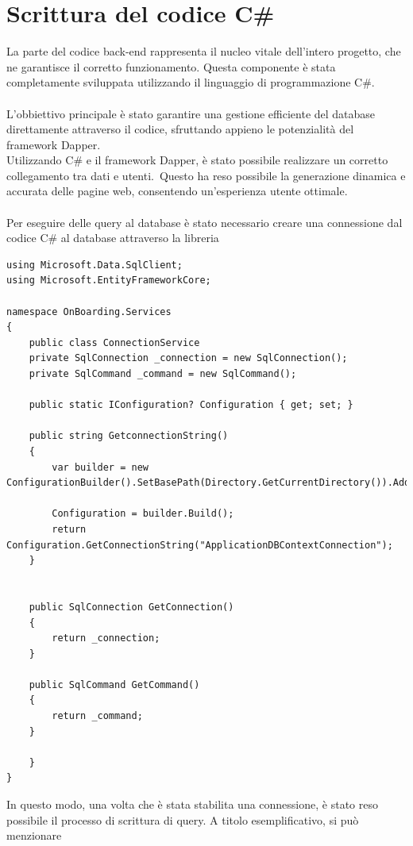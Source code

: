 \section{Scrittura del codice C\#}\label{sec:cap_sec_subsec}
La parte del codice back-end rappresenta il nucleo vitale dell'intero progetto, 
che ne garantisce il corretto funzionamento. Questa componente è stata completamente 
sviluppata utilizzando il linguaggio di programmazione C\#.
\\ \\
L'obbiettivo principale è stato garantire una gestione efficiente del database
direttamente attraverso il codice, sfruttando appieno le potenzialità del
framework Dapper. \\ 
Utilizzando C\# e il framework Dapper, è stato possibile
realizzare un corretto collegamento tra dati e utenti.\ Questo ha reso
possibile la generazione dinamica e accurata delle pagine web, consentendo
un'esperienza utente ottimale. 
\\ \\ 
Per eseguire delle query al database è
stato necessario creare una connessione dal codice C\# al database attraverso
la libreria 
%
\begin{lstlisting}[style=cs_style, caption=classe per ottenere la stringa di connessione per il collegamento al database]
using Microsoft.Data.SqlClient;
using Microsoft.EntityFrameworkCore;

namespace OnBoarding.Services
{
	public class ConnectionService
	private SqlConnection _connection = new SqlConnection();
	private SqlCommand _command = new SqlCommand();

	public static IConfiguration? Configuration { get; set; }

	public string GetconnectionString()
	{
		var builder = new ConfigurationBuilder().SetBasePath(Directory.GetCurrentDirectory()).AddJsonFile("appsettings.json");

		Configuration = builder.Build();
		return Configuration.GetConnectionString("ApplicationDBContextConnection");
	}


	public SqlConnection GetConnection() 
	{
		return _connection;
	}

	public SqlCommand GetCommand()
	{
		return _command;
	}

	}
}
\end{lstlisting}
%
In questo modo, una volta che è stata stabilita una connessione, 
è stato reso possibile il processo di scrittura di query. A titolo esemplificativo, si può menzionare 
